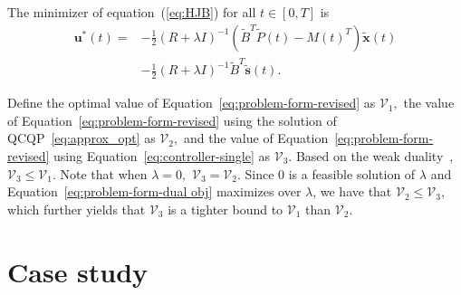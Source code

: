 \documentclass[journal]{IEEEtran}
\begin{document}
The minimizer of equation~(\ref{eq:HJB}) for all $t \in [0, T]$ is 
\begin{align}
    \mathbf{u}^{\ast}(t) = &- \frac{1}{2}(R+\lambda I)^{-1}(\widetilde{B}^{T}\widetilde{P}(t) - M(t)^T)\widetilde{\mathbf{x}}(t) \nonumber\\
    &- \frac{1}{2}(R+\lambda I)^{-1}\widetilde{B}^{T}\widetilde{\mathbf{s}}(t).
    \label{eq:controller-single}
\end{align}

Define the optimal value of Equation~\eqref{eq:problem-form-revised} as $\mathcal{V}_1,$ the value of Equation~\eqref{eq:problem-form-revised} using the solution of QCQP~\eqref{eq:approx_opt} as $\mathcal{V}_2,$ and the value of Equation~\eqref{eq:problem-form-revised} using Equation~\eqref{eq:controller-single} as $\mathcal{V}_3.$ Based on the weak duality~\cite{shapiro2005duality},
$\mathcal{V}_3 \leq \mathcal{V}_1.$ Note that when $\lambda=0,$ $\mathcal{V}_3  = \mathcal{V}_2.$ Since $0$ is a feasible solution of $\lambda$ and Equation~\eqref{eq:problem-form-dual obj} maximizes over $\lambda$, we have that $\mathcal{V}_2  \leq \mathcal{V}_3,$
which further yields that $\mathcal{V}_3$ is a tighter bound to $\mathcal{V}_1$ than $\mathcal{V}_2$.



\section{Case study}
\label{sec:simulation}

\end{document}
